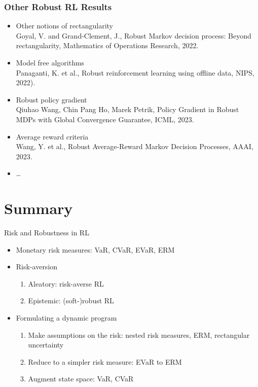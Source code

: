 \documentclass{beamer}
\begin{document}
\begin{frame} \frametitle{Other Robust RL Results}
 \begin{itemize}
  \item Other notions of rectangularity \\
  {\tiny Goyal, V. and Grand-Clement, J., Robust Markov decision process: Beyond rectangularity, Mathematics of Operations Research, 2022.
}  
\item Model free algorithms \\
  {\tiny Panaganti, K. et al., Robust reinforcement learning using offline data, NIPS, 2022).
 }
\item Robust policy gradient \\
  {\tiny Qiuhao Wang, Chin Pang Ho, Marek Petrik, Policy Gradient in Robust MDPs with Global Convergence Guarantee, ICML, 2023.}
\item Average reward criteria \\
  {\tiny Wang, Y. et al., Robust Average-Reward Markov Decision Processes, AAAI, 2023.
  }
\item \ldots
  \end{itemize}
\end{frame}


\section{Summary}

\begin{frame}{Risk and Robustness in RL}
  \begin{itemize}
  \item Monetary risk measures: VaR, CVaR, EVaR, ERM
    \vfill 
  \item Risk-aversion
    \begin{enumerate}
    \item Aleatory: risk-averse RL
    \item Epistemic: (soft-)robust RL
    \end{enumerate}
  \vfill 
\item Formulating a dynamic program
  \begin{enumerate}
  \item Make assumptions on the risk: nested risk measures, ERM, rectangular uncertainty
  \item Reduce to a simpler risk measure: EVaR to ERM
  \item Augment state space: VaR, CVaR
  \end{enumerate}
  \end{itemize}
  
\end{frame}
\end{document}
